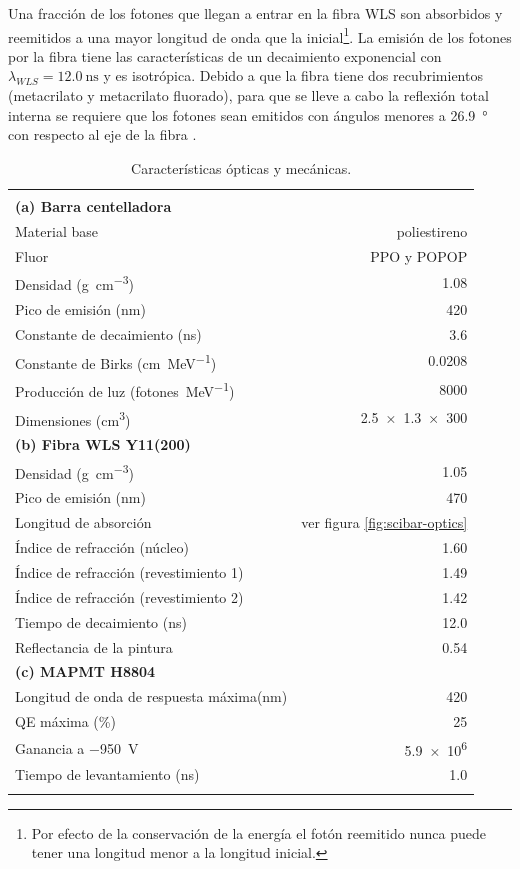 Una fracción de los fotones que llegan a entrar en la fibra WLS son absorbidos y reemitidos a una mayor longitud de onda que la inicial\footnote{Por efecto de la conservación de la energía el fotón reemitido nunca puede tener una longitud menor a la longitud inicial.}. La emisión de los fotones por la fibra tiene las características de un decaimiento exponencial con $\lambda_{WLS}=\SI{12.0}{\nano\second}$ y es isotrópica. Debido a que la fibra tiene dos recubrimientos (metacrilato y metacrilato fluorado), para que se lleve a cabo la reflexión total interna se requiere que los fotones sean emitidos con ángulos menores a \SI{26.9}{\degree} con respecto al eje de la fibra \cite{kikawa14}.

\begin{table}
\caption{Características ópticas y mecánicas.}
\label{table:optics}

\begin{tabular}{lr}

\multicolumn{2}{c}{}\\
\cmidrule(r){1-2}
\addlinespace[5pt]
\textbf{(a) Barra centelladora}\\
\addlinespace[5pt]
\cmidrule(r){1-2}
Material base & poliestireno\\
Fluor & PPO y POPOP\\
Densidad (\si{\gram\per\cubic\cm}) & \num{1.08}\\
Pico de emisión (\si{\nm}) & \num{420}\\
Constante de decaimiento (\si{\ns}) & \num{3.6}\\
Constante de Birks (\si{\cm\per\mega\electronvolt}) & \num{0.0208}\\
Producción de luz (\si{fotones\per\mega\electronvolt}) & \num{8000}\\
Dimensiones (\si{\cubic\cm}) & \num[product-units=power]{2.5x1.3x300}\\
\addlinespace[10pt]
\textbf{(b) Fibra WLS Y11(200)}\\
\addlinespace[5pt]
\cmidrule(r){1-2}
Densidad (\si{\gram\per\cubic\cm}) & \num{1.05}\\
Pico de emisión (\si{\nm}) & \num{470}\\
Longitud de absorción & ver figura \ref{fig:scibar-optics}\\
Índice de refracción (núcleo) & \num{1.60}\\
Índice de refracción (revestimiento 1) & \num{1.49}\\
Índice de refracción (revestimiento 2) & \num{1.42}\\
Tiempo de decaimiento (\si{\ns}) & \num{12.0}\\
Reflectancia de la pintura & 0.54\\
\addlinespace[10pt]
\textbf{(c) MAPMT H8804}\\
\addlinespace[5pt]
\cmidrule(r){1-2}
Longitud de onda de respuesta máxima(\si{\nm}) & \num{420}\\
QE máxima (\si{\percent})  & \num{25}\\
Ganancia a \SI{-950}{\volt} & \num{5.9e6}\\
Tiempo de levantamiento (\si{\ns}) & \num{1.0}\\
\addlinespace[5pt]
\bottomrule


\end{tabular}
\end{table}
